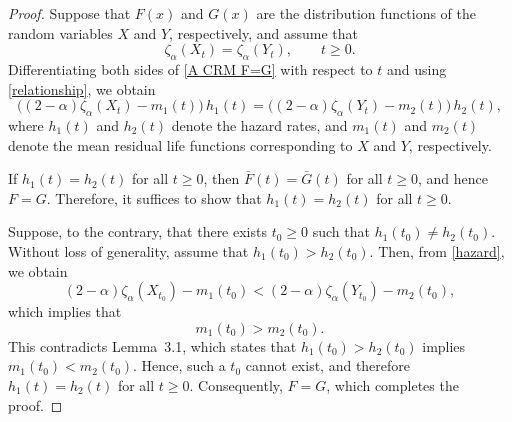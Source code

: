 \documentclass[10pt,a4paper]{amsart}
\begin{document}
 \begin{proof}
Suppose that $F(x)$ and $G(x)$ are the distribution functions of the random variables
$X$ and $Y$, respectively, and assume that
\begin{equation}\label{A CRM F=G}
\zeta_{\alpha}(X_t)=\zeta_{\alpha}(Y_t), \qquad t \ge 0 .
\end{equation}
Differentiating both sides of \eqref{A CRM F=G} with respect to $t$ and using
\eqref{relationship}, we obtain
\begin{equation}\label{hazard}
\bigl((2-\alpha)\zeta_{\alpha}(X_t)-m_{1}(t)\bigr)\,h_{1}(t)
=
\bigl((2-\alpha)\zeta_{\alpha}(Y_t)-m_{2}(t)\bigr)\,h_{2}(t),
\end{equation}
where $h_{1}(t)$ and $h_{2}(t)$ denote the hazard rates, and $m_{1}(t)$ and $m_{2}(t)$
denote the mean residual life functions corresponding to $X$ and $Y$, respectively.

If $h_{1}(t)=h_{2}(t)$ for all $t \ge 0$, then $\bar{F}(t)=\bar{G}(t)$ for all
$t \ge 0$, and hence $F=G$. Therefore, it suffices to show that
$h_{1}(t)=h_{2}(t)$ for all $t \ge 0$.

Suppose, to the contrary, that there exists $t_0 \ge 0$ such that
$h_{1}(t_0)\neq h_{2}(t_0)$. Without loss of generality, assume that
$h_{1}(t_0)>h_{2}(t_0)$. Then, from \eqref{hazard}, we obtain
\[
(2-\alpha)\zeta_{\alpha}(X_{t_0})-m_{1}(t_0)
<
(2-\alpha)\zeta_{\alpha}(Y_{t_0})-m_{2}(t_0),
\]
which implies that
\[
m_{1}(t_0)>m_{2}(t_0).
\]
This contradicts Lemma~3.1, which states that $h_{1}(t_0)>h_{2}(t_0)$ implies
$m_{1}(t_0)<m_{2}(t_0)$. Hence, such a $t_0$ cannot exist, and therefore
$h_{1}(t)=h_{2}(t)$ for all $t \ge 0$. Consequently, $F=G$, which completes the proof.
\end{proof}
\end{document}
